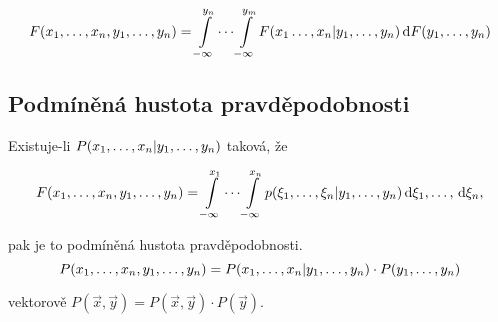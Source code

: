 	\[ F(x_1,\ldots,x_n,y_1,\ldots,y_n) = \int\limits_{-\infty}^{y_n}\cdots\int\limits_{-\infty}^{y_m} F(x_1\ldots,x_n|y_1,\ldots,y_n)\d F(y_1,\ldots,y_n) \]
	
	\subsection{Podmíněná hustota pravděpodobnosti}
	Existuje-li $P(\svecrow[x]|\svecrow[y])$ taková, že 
	
	\[ F(\svecrow[x],\svecrow[y])=\int\limits_{-\infty}^{x_1}\cdots\int\limits_{-\infty}^{x_n}p(\svecrow[\xi]|\svecrow[y])\svecrow[\d\xi], \]
	
	pak je to podmíněná hustota pravděpodobnosti.
	\[ P(\svecrow[x],\svecrow[y])=P(\svecrow[x]|\svecrow[y])\cdot P(\svecrow[y]) \]
	
	vektorově $P(\vec{x},\vec{y})=P(\vec{x},\vec{y})\cdot P(\vec{y})$.